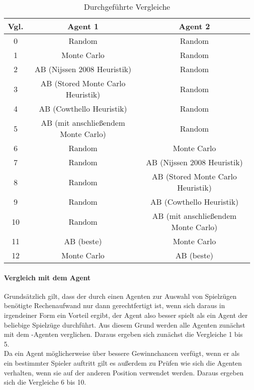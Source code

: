 \begin{table}[ht]
\begin{center}
\begin{tabular}{| c | c | c |} \hline
Vgl. & Agent 1 & Agent 2 \\ \hline
\hline
0 & Random & Random  \\ \hline
\hline
 1 & Monte Carlo                         & Random  \\ \hline
 2 & AB (Nijssen 2008 Heuristik)         & Random\\ \hline
 3 & AB (Stored Monte Carlo Heuristik)   & Random\\ \hline
 4 & AB (Cowthello Heuristik)            & Random\\ \hline
 5 & AB (mit anschließendem Monte Carlo) & Random\\ \hline
\hline
 6 & Random                              & Monte Carlo                         \\ \hline
 7 & Random                              & AB (Nijssen 2008 Heuristik)         \\ \hline
 8 & Random                              & AB (Stored Monte Carlo Heuristik)   \\ \hline
 9 & Random                              & AB (Cowthello Heuristik)            \\ \hline
10 & Random                              & AB (mit anschließendem Monte Carlo) \\ \hline
\hline
11 & AB (beste)                          & Monte Carlo                         \\ \hline
12 & Monte Carlo                         & AB (beste)                          \\ \hline
\end{tabular}
\end{center}
\caption{Durchgeführte Vergleiche}
\label{tbl:cmp-agents}
\end{table}

\paragraph{Vergleich mit dem Agent }
Grundsätzlich gilt, dass der durch einen Agenten zur Auswahl von Spielzügen benötigte Rechenaufwand nur dann gerechtfertigt ist, wenn sich daraus in irgendeiner Form ein Vorteil ergibt, der Agent also besser spielt als ein Agent der beliebige Spielzüge durchführt. Aus diesem Grund werden alle Agenten zunächst mit dem -Agenten verglichen. Daraus ergeben sich zunächst die Vergleiche 1 bis 5.
\\Da ein Agent möglicherweise über bessere Gewinnchancen verfügt, wenn er als ein bestimmter Spieler auftritt gilt es außerdem zu Prüfen wie sich die Agenten verhalten, wenn sie auf der anderen Position verwendet werden. Daraus ergeben sich die Vergleiche 6 bis 10. 

